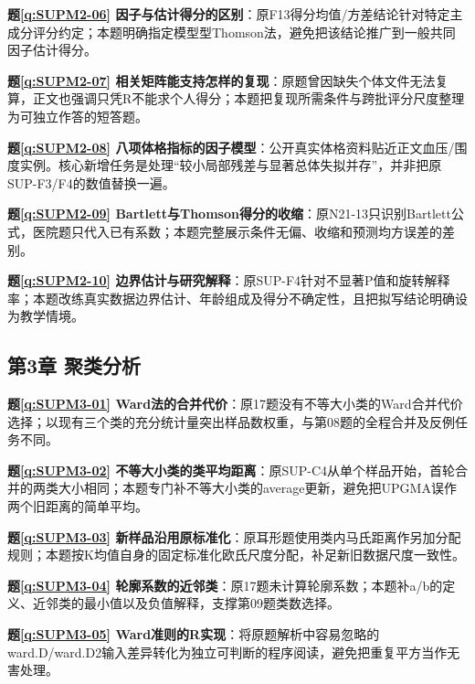 \noindent\textbf{题\ref*{q:SUPM2-06} 因子与估计得分的区别}：原F13得分均值/方差结论针对特定主成分评分约定；本题明确指定模型型Thomson法，避免把该结论推广到一般共同因子估计得分。\par

\noindent\textbf{题\ref*{q:SUPM2-07} 相关矩阵能支持怎样的复现}：原题曾因缺失个体文件无法复算，正文也强调只凭R不能求个人得分；本题把复现所需条件与跨批评分尺度整理为可独立作答的短答题。\par

\noindent\textbf{题\ref*{q:SUPM2-08} 八项体格指标的因子模型}：公开真实体格资料贴近正文血压/围度实例。核心新增任务是处理“较小局部残差与显著总体失拟并存”，并非把原SUP-F3/F4的数值替换一遍。\par

\noindent\textbf{题\ref*{q:SUPM2-09} Bartlett与Thomson得分的收缩}：原N21-13只识别Bartlett公式，医院题只代入已有系数；本题完整展示条件无偏、收缩和预测均方误差的差别。\par

\noindent\textbf{题\ref*{q:SUPM2-10} 边界估计与研究解释}：原SUP-F4针对不显著P值和旋转解释率；本题改练真实数据边界估计、年龄组成及得分不确定性，且把拟写结论明确设为教学情境。\par

\subsection*{第3章 聚类分析}

\noindent\textbf{题\ref*{q:SUPM3-01} Ward法的合并代价}：原17题没有不等大小类的Ward合并代价选择；以现有三个类的充分统计量突出样品数权重，与第08题的全程合并及反例任务不同。\par

\noindent\textbf{题\ref*{q:SUPM3-02} 不等大小类的类平均距离}：原SUP-C4从单个样品开始，首轮合并的两类大小相同；本题专门补不等大小类的average更新，避免把UPGMA误作两个旧距离的简单平均。\par

\noindent\textbf{题\ref*{q:SUPM3-03} 新样品沿用原标准化}：原耳形题使用类内马氏距离作另加分配规则；本题按K均值自身的固定标准化欧氏尺度分配，补足新旧数据尺度一致性。\par

\noindent\textbf{题\ref*{q:SUPM3-04} 轮廓系数的近邻类}：原17题未计算轮廓系数；本题补a/b的定义、近邻类的最小值以及负值解释，支撑第09题类数选择。\par

\noindent\textbf{题\ref*{q:SUPM3-05} Ward准则的R实现}：将原题解析中容易忽略的ward.D/ward.D2输入差异转化为独立可判断的程序阅读，避免把重复平方当作无害处理。\par

